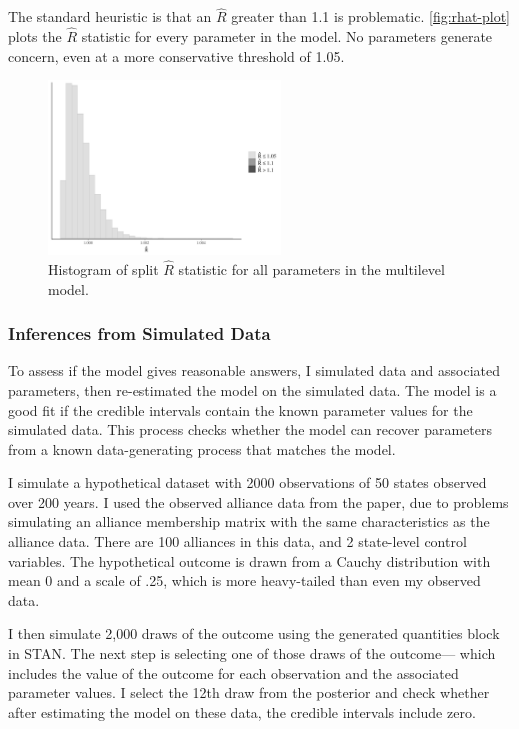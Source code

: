 \documentclass[12pt]{article}
\begin{document}
The standard heuristic is that an $\hat{R}$ greater than 1.1 is problematic. 
\autoref{fig:rhat-plot} plots the $\hat{R}$ statistic for every parameter in the model. 
No parameters generate concern, even at a more conservative threshold of 1.05. 


\begin{figure}[htbp]
	\centering
		\includegraphics[width=0.55\textwidth]{rhat-plot.pdf}
	\caption{Histogram of split $\hat{R}$ statistic for all parameters in the multilevel model.}
	\label{fig:rhat-plot}
\end{figure}


\subsubsection{Inferences from Simulated Data}


To assess if the model gives reasonable answers, I simulated data and associated parameters, then re-estimated the model on the simulated data.
The model is a good fit if the credible intervals contain the known parameter values for the simulated data. 
This process checks whether the model can recover parameters from a known data-generating process that matches the model. 


I simulate a hypothetical dataset with 2000 observations of 50 states observed over 200 years.
I used the observed alliance data from the paper, due to problems simulating an alliance membership matrix with the same characteristics as the alliance data. 
There are 100 alliances in this data, and 2 state-level control variables. 
The hypothetical outcome is drawn from a Cauchy distribution with mean 0 and a scale of .25, which is more heavy-tailed than even my observed data. 


I then simulate 2,000 draws of the outcome using the generated quantities block in STAN. 
The next step is selecting one of those draws of the outcome--- which includes the value of the outcome for each observation and the associated parameter values. 
I select the 12th draw from the posterior and check whether after estimating the model on these data, the credible intervals include zero. 
\end{document}
